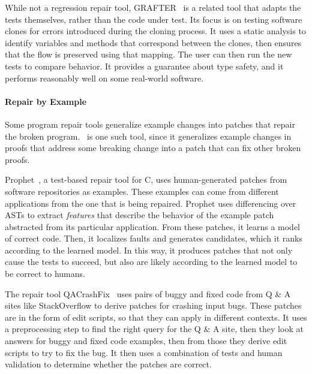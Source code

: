 While not a regression repair tool, GRAFTER~\cite{Zhang:2017:ATD:3097368.3097448} is a related tool that adapts the tests themselves,
rather than the code under test. Its focus is on testing software clones for errors introduced during the
cloning process. It uses a static analysis to identify variables and methods that correspond between the clones,
then ensures that the flow is preserved using that mapping. The user can then run the new tests to compare behavior.
It provides a guarantee about type safety, and it performs reasonably well on some real-world software.

\paragraph{Repair by Example} %
Some program repair tools generalize example changes into patches that repair the broken program.
\sysname\ is one such tool, since it generalizes example changes in proofs that address some breaking change
into a patch that can fix other broken proofs. 

Prophet~\cite{Long:2016:APG:2837614.2837617}, a test-based
repair tool for C,
uses human-generated patches from software repositories as examples.
These examples can come from different applications from the one that is being repaired.
Prophet uses differencing over ASTs %
to extract \textit{features} that describe the behavior of the example patch abstracted from its particular application. %
From these patches, it learns a model of correct code. Then,
it localizes faults and generates candidates, which it ranks according to the learned model.
In this way, it produces patches that not only cause the tests to succeed, but also
are likely according to the learned model to be correct to humans. %

The repair tool QACrashFix~\cite{gao2015fixing} uses pairs of buggy and fixed code from Q \& A sites like
StackOverflow to derive patches for crashing input bugs. These patches are in the form of edit scripts,
so that they can apply in different contexts. %
It uses a preprocessing step to find the right query for the Q \& A site, then they
look at answers for buggy and fixed code examples, then from those they derive edit scripts to try to fix the bug.
It then uses a combination of tests and human validation to determine whether the patches are correct. %

